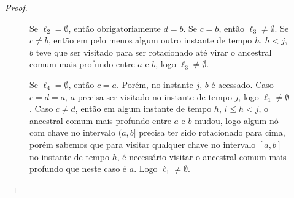 \begin{proof}
\begin{figure}[H]
    \centering
    \vfill %
    \begin{minipage}[t]{0.6\textwidth}
        Se $\ell_2 = \emptyset$, então obrigatoriamente $d = b$. Se $c = b$, então $\ell_3 \neq \emptyset$. Se $c \neq b$, então em pelo menos algum outro instante de tempo $h$, $h < j$, $b$ teve que ser visitado para ser rotacionado até virar o ancestral comum mais profundo entre $a$ e $b$, logo $\ell_3 \neq \emptyset$.   

        Se $\ell_4 = \emptyset$, então $c = a$. Porém, no instante $j$, $b$ é acessado. Caso $c = d = a$, $a$ precisa ser visitado no instante de tempo $j$, logo $\ell_1 \neq \emptyset$. Caso $c \neq d$, então em algum instante de tempo $h$, $i \leq h < j$, o ancestral comum mais profundo entre $a$ e $b$ mudou, logo algum nó com chave no intervalo $(a,b]$ precisa ter sido rotacionado para cima, porém sabemos que para visitar qualquer chave no intervalo $[a,b]$ no instante de tempo $h$, é necessário visitar o ancestral comum mais profundo que neste caso é $a$. Logo $\ell_1 \neq \emptyset$. 
    \end{minipage}\hfill
    \begin{minipage}[t]{0.4\textwidth}
        \centering
        \begin{figure}[H]
            \centering
            \begin{adjustbox}{valign=t, raise=-25pt} %
\end{adjustbox}
\end{figure}
\end{minipage}
\end{figure}
\end{proof}
